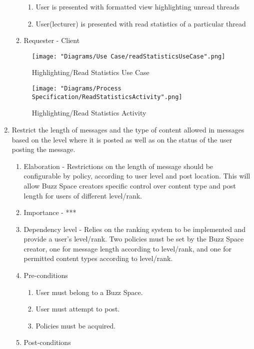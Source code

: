 \documentclass[12pt]{article}
\begin{document}
\begin{enumerate}
\begin{enumerate}
    \begin{enumerate}
    	\item User is presented with formatted view highlighting unread threads
    	\item User(lecturer) is presented with read statistics of a particular thread
    \end{enumerate}
    \item Requester - Client
  \end{enumerate}
  \begin{figure}[h]
  		\centering
  		\texttt{[image: "Diagrams/Use Case/readStatisticsUseCase".png]}
  		\caption{Highlighting/Read Statistics Use Case}
  	\end{figure}
  	\begin{figure}[h]
  		\centering
  		\texttt{[image: "Diagrams/Process Specification/ReadStatisticsActivity".png]}
  		\caption{Highlighting/Read Statistics Activity}
  	\end{figure}
\newpage %
  \item Restrict the length of messages and the type of content allowed in messages based
on the level where it is posted as well as on the status of the user posting the
message.  %
  \begin{enumerate}
    \item Elaboration - Restrictions on the length of message should be configurable by policy, according to user level and post location. This will allow Buzz Space creators specific control over content type and post length for users of different level/rank.
    \item Importance - ***
    \item Dependency level - Relies on the ranking system to be implemented and provide a user's level/rank. Two policies must be set by the Buzz Space creator, one for message length according to level/rank, and one for permitted content types according to level/rank.
    \item Pre-conditions
    \begin{enumerate}
    	\item User must belong to a Buzz Space.
    	\item User must attempt to post.
	\item Policies must be acquired.
    \end{enumerate}
        \item Post-conditions

\end{enumerate}
\end{enumerate}
\end{document}
